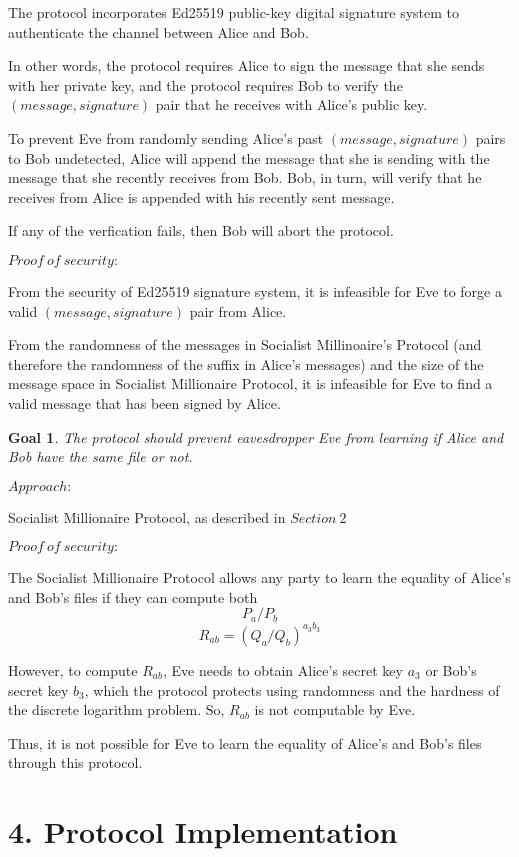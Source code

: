 \documentclass{article}
\newtheorem{goal}{Goal}
\begin{document}
The protocol incorporates Ed25519 public-key digital signature system to authenticate 
the channel between Alice and Bob. 

In other words, the protocol requires Alice to sign 
the message that she sends with her private key, and the protocol requires Bob to 
verify the $(message, signature)$ pair that he receives with Alice's public key.

To prevent Eve from randomly sending Alice's past $(message, signature)$ pairs 
to Bob undetected, Alice will append the message that she is sending with the 
message that she recently receives from Bob. Bob, in turn, will verify that he 
receives from Alice is appended with his recently sent message.

If any of the verfication fails, then Bob will abort the protocol.

$Proof\ of\ security:$

From the security of Ed25519 signature system, it is infeasible for Eve to 
forge a valid $(message, signature)$ pair from Alice.

From the randomness of the messages in Socialist Millinoaire's Protocol (and therefore 
the randomness of the suffix in Alice's messages) and the size of the message space in 
Socialist Millionaire Protocol, it is infeasible for Eve to find a valid message 
that has been signed by Alice.

\begin{goal}
The protocol should prevent eavesdropper Eve from learning if Alice and Bob have the 
same file or not.
\end{goal}

$Approach:$ 

Socialist Millionaire Protocol, as described in $Section\ 2$

$Proof\ of\ security:$

The Socialist Millionaire Protocol allows any party to learn the equality of 
Alice's and Bob's files if they can compute both
$$P_a / P_b$$ $$R_{ab} = (Q_a/Q_b)^{a_3b_3}$$

However, to compute $R_{ab}$, Eve needs to obtain Alice's secret key $a_3$
or Bob's secret key $b_3$, which the protocol protects using randomness and 
the hardness of the discrete logarithm problem. So, $R_{ab}$ is not computable
by Eve.

Thus, it is not possible for Eve to learn the equality of Alice's and Bob's files 
through this protocol.

\section*{4. Protocol Implementation}
\end{document}
